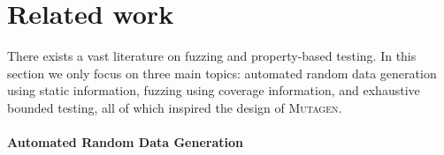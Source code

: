\documentclass[acmsmall, anonymous]{acmart}
\newcommand{\mutagen}{\textsc{Mutagen}\xspace}
\begin{document}






\section{Related work}
\label{sec:related}

There exists a vast literature on fuzzing and property-based testing.
%
In this section we only focus on three main topics:
%
automated random data generation using static information,
%
fuzzing using coverage information, and
%
exhaustive bounded testing, all of which inspired the design of \mutagen.


\paragraph{Automated Random Data Generation}
\end{document}
